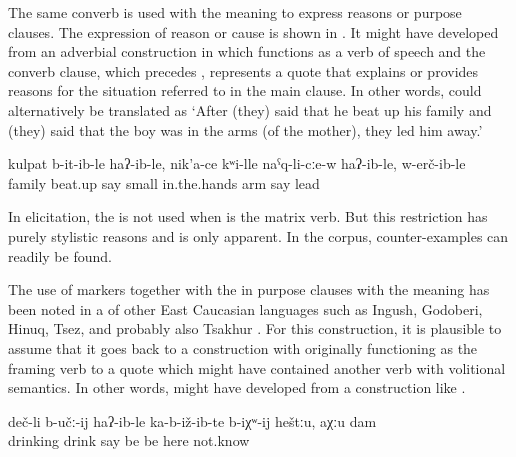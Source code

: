 The same converb is used with the meaning  to express reasons or purpose clauses. The expression of reason or cause is shown in . It might have developed from an adverbial construction in which  functions as a verb of speech and the converb clause, which precedes , represents a quote that explains or provides reasons for the situation referred to in the main clause. In other words,  could alternatively be translated as `After (they) said that he beat up his family and (they) said that the boy was in the arms (of the mother), they led him away.'

%
\begin{exe}
	\ex	\label{ex:Because he beat up his family, because the boy was in the arms (of the mother), they led him away}
	\gll	kulpat	b-it-ib-le	haʔ-ib-le,	nik'a-ce	kʷi-lle	naˁq-li-cːe-w	haʔ-ib-le,	w-erč-ib-le\\
		family	beat.up	say	small	in.the.hands	arm	say	lead\\
	\glt	{}
\end{exe}

In elicitation, the    is not used when  is the matrix verb. But this restriction has purely stylistic reasons and is only apparent. In the corpus, counter-examples can readily be found.

The use of  markers together with the  in purpose clauses with the meaning  has been noted in a  of other East Caucasian languages such as Ingush, Godoberi, Hinuq, Tsez, and probably also Tsakhur \citep{Forker2016c}. For this construction, it is plausible to assume that it goes back to a  construction with  originally functioning as the framing verb to a quote which might have contained another verb with volitional semantics. In other words,  might have developed from a construction like .
%
\begin{exe}
	\ex	\label{ex:They probably sit down in order to drink here, I do not know}
	\gll	deč-li	b-učː-ij	haʔ-ib-le	ka-b-iž-ib-te	b-iχʷ-ij	heštːu,	aχːu	dam\\
		drinking	drink	say	be be	here	not.know	\\
	\glt	{}
\end{exe}


